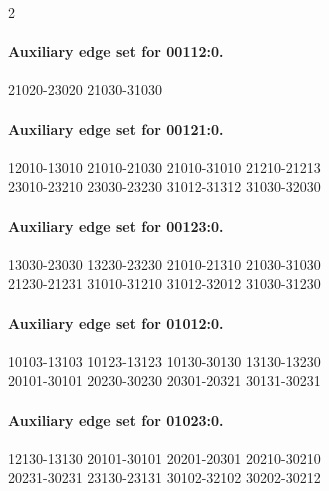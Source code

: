 \begin{multicols}{2}
\paragraph{Auxiliary edge set for 00112:0.}
\begingroup\footnotesize\ttfamily\begin{flushleft}
21020-23020 21030-31030\\
\end{flushleft}\endgroup
\paragraph{Auxiliary edge set for 00121:0.}
\begingroup\footnotesize\ttfamily\begin{flushleft}
12010-13010 21010-21030 21010-31010 21210-21213\\
23010-23210 23030-23230 31012-31312 31030-32030\\
\end{flushleft}\endgroup
\paragraph{Auxiliary edge set for 00123:0.}
\begingroup\footnotesize\ttfamily\begin{flushleft}
13030-23030 13230-23230 21010-21310 21030-31030\\
21230-21231 31010-31210 31012-32012 31030-31230\\
\end{flushleft}\endgroup
\paragraph{Auxiliary edge set for 01012:0.}
\begingroup\footnotesize\ttfamily\begin{flushleft}
10103-13103 10123-13123 10130-30130 13130-13230\\
20101-30101 20230-30230 20301-20321 30131-30231\\
\end{flushleft}\endgroup
\paragraph{Auxiliary edge set for 01023:0.}
\begingroup\footnotesize\ttfamily\begin{flushleft}
12130-13130 20101-30101 20201-20301 20210-30210\\
20231-30231 23130-23131 30102-32102 30202-30212\\
\end{flushleft}\endgroup

\end{multicols}
